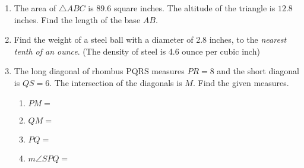 \documentclass[12pt, twoside]{article}
\begin{document}
\begin{enumerate}
  \item The area of $\triangle ABC$ is $89.6$ square inches. The altitude of the triangle is $12.8$ inches. Find the length of the base $AB$.\\[0.5cm]
     \vspace{2.25cm}

  \item Find the weight of a steel ball with a diameter of 2.8 inches, to the \emph{nearest tenth of an ounce}. (The density of steel is 4.6 ounce per cubic inch)

\newpage


  \item The long diagonal of rhombus PQRS measures $PR=8$ and the short diagonal is $QS=6$. The intersection of the diagonals is $M$. Find the given measures.\vspace{0.25cm}
    \begin{multicols}{2}
      \begin{enumerate}
        \item $PM=$ \vspace{0.5cm}
        \item $QM=$ \vspace{0.5cm}
        \item $PQ=$ \vspace{0.5cm}
        \item $m\angle SPQ=$\vspace{1.5cm}
      \end{enumerate}
    \end{multicols}
    \vspace{3cm}


\end{enumerate}
\end{document}
